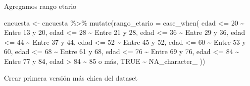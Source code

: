 \documentclass[
]{article}
\newenvironment{Shaded}{\begin{snugshade}}{\end{snugshade}}
\newcommand{\AttributeTok}[1]{\textcolor[rgb]{0.77,0.63,0.00}{#1}}
\newcommand{\ConstantTok}[1]{\textcolor[rgb]{0.00,0.00,0.00}{#1}}
\newcommand{\DecValTok}[1]{\textcolor[rgb]{0.00,0.00,0.81}{#1}}
\newcommand{\FunctionTok}[1]{\textcolor[rgb]{0.00,0.00,0.00}{#1}}
\newcommand{\NormalTok}[1]{#1}
\newcommand{\OtherTok}[1]{\textcolor[rgb]{0.56,0.35,0.01}{#1}}
\newcommand{\SpecialCharTok}[1]{\textcolor[rgb]{0.00,0.00,0.00}{#1}}
\newcommand{\StringTok}[1]{\textcolor[rgb]{0.31,0.60,0.02}{#1}}
\begin{document}
Agregamos rango etario

\begin{Shaded}
\begin{Highlighting}[]
\NormalTok{encuesta }\OtherTok{\textless{}{-}}\NormalTok{ encuesta }\SpecialCharTok{\%\textgreater{}\%} \FunctionTok{mutate}\NormalTok{(}\AttributeTok{rango\_etario =} \FunctionTok{case\_when}\NormalTok{(}
\NormalTok{  edad }\SpecialCharTok{\textless{}=} \DecValTok{20} \SpecialCharTok{\textasciitilde{}} \StringTok{\textquotesingle{}Entre 13 y 20\textquotesingle{}}\NormalTok{,}
\NormalTok{  edad }\SpecialCharTok{\textless{}=} \DecValTok{28} \SpecialCharTok{\textasciitilde{}} \StringTok{\textquotesingle{}Entre 21 y 28\textquotesingle{}}\NormalTok{,}
\NormalTok{  edad }\SpecialCharTok{\textless{}=} \DecValTok{36} \SpecialCharTok{\textasciitilde{}} \StringTok{\textquotesingle{}Entre 29 y 36\textquotesingle{}}\NormalTok{,}
\NormalTok{  edad }\SpecialCharTok{\textless{}=} \DecValTok{44} \SpecialCharTok{\textasciitilde{}} \StringTok{\textquotesingle{}Entre 37 y 44\textquotesingle{}}\NormalTok{,}
\NormalTok{  edad }\SpecialCharTok{\textless{}=} \DecValTok{52} \SpecialCharTok{\textasciitilde{}} \StringTok{\textquotesingle{}Entre 45 y 52\textquotesingle{}}\NormalTok{,}
\NormalTok{  edad }\SpecialCharTok{\textless{}=} \DecValTok{60} \SpecialCharTok{\textasciitilde{}} \StringTok{\textquotesingle{}Entre 53 y 60\textquotesingle{}}\NormalTok{,}
\NormalTok{  edad }\SpecialCharTok{\textless{}=} \DecValTok{68} \SpecialCharTok{\textasciitilde{}} \StringTok{\textquotesingle{}Entre 61 y 68\textquotesingle{}}\NormalTok{,}
\NormalTok{  edad }\SpecialCharTok{\textless{}=} \DecValTok{76} \SpecialCharTok{\textasciitilde{}} \StringTok{\textquotesingle{}Entre 69 y 76\textquotesingle{}}\NormalTok{,}
\NormalTok{  edad }\SpecialCharTok{\textless{}=} \DecValTok{84} \SpecialCharTok{\textasciitilde{}} \StringTok{\textquotesingle{}Entre 77 y 84\textquotesingle{}}\NormalTok{,}
\NormalTok{  edad }\SpecialCharTok{\textgreater{}} \DecValTok{84} \SpecialCharTok{\textasciitilde{}} \StringTok{\textquotesingle{}85 o más\textquotesingle{}}\NormalTok{,}
  \ConstantTok{TRUE} \SpecialCharTok{\textasciitilde{}} \ConstantTok{NA\_character\_}
\NormalTok{))}
\end{Highlighting}
\end{Shaded}

Crear primera versión más chica del dataset
\end{document}
